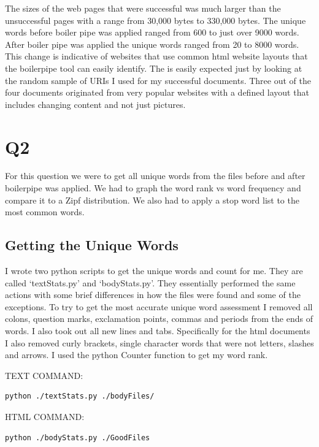 \documentclass[12pt]{article}
\begin{document}
The sizes of the web pages that were successful was much larger than the unsuccessful pages with a range from 30,000 bytes to 330,000 bytes.  The unique words before boiler pipe was applied ranged from 600 to just over 9000 words. After boiler pipe was applied the unique words ranged from 20 to 8000 words. This change is indicative of websites that use common html website layouts that the boilerpipe tool can easily identify. The is easily expected just by looking at the random sample of URIs I used for my successful documents. Three out of the four documents originated from very popular websites with a defined layout that includes changing content and not just pictures.

\section{Q2}
For this question we were to get all unique words from the files before and after boilerpipe was applied. We had to graph the word rank vs word frequency and compare it to a Zipf distribution. We also had to apply a stop word list to the most common words.

\subsection{Getting the Unique Words}
I wrote two python scripts to get the unique words and count for me.  They are called `textStats.py' and `bodyStats.py'.  They essentially performed the same actions with some brief differences in how the files were found and some of the exceptions.  To try to get the most accurate unique word assessment I removed all colons, question marks, exclamation points, commas and periods from the ends of words.  I also took out all new lines and tabs.  Specifically for the html documents I also removed curly brackets, single character words that were not letters, slashes and arrows.  I used the python Counter function to get my word rank.

TEXT COMMAND:\\
\begin{lstlisting}[language=bash]
    python ./textStats.py ./bodyFiles/
\end{lstlisting}

HTML COMMAND:\\
\begin{lstlisting}[language=bash]
    python ./bodyStats.py ./GoodFiles
\end{lstlisting}
\end{document}
